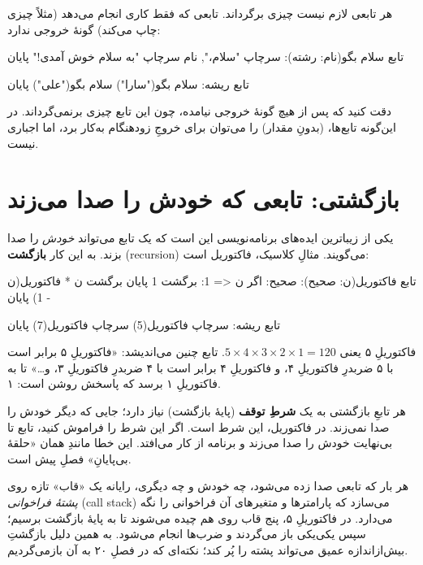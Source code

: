 هر تابعی لازم نیست چیزی برگرداند. تابعی که فقط کاری انجام می‌دهد (مثلاً چیزی
چاپ می‌کند) گونهٔ خروجی ندارد:

\begin{salamfa}
تابع سلام بگو(نام: رشته):
    سرچاپ "سلام،", نام
    سرچاپ "به سلام خوش آمدی!"
پایان

تابع ریشه:
    سلام بگو("سارا")
    سلام بگو("علی")
پایان
\end{salamfa}

دقت کنید که پس از  هیچ گونهٔ خروجی نیامده، چون این تابع چیزی
برنمی‌گرداند. در این‌گونه تابع‌ها،  (بدونِ مقدار) را می‌توان برای
خروجِ زودهنگام به‌کار برد، اما اجباری نیست.

\section{بازگشتی: تابعی که خودش را صدا می‌زند}

یکی از زیباترین ایده‌های برنامه‌نویسی این است که یک تابع می‌تواند \emph{خودش}
را صدا بزند. به این کار \textbf{بازگشت} (recursion)
می‌گویند. مثالِ کلاسیک، فاکتوریل است:

\begin{salamfa}
تابع فاکتوریل(ن: صحیح): صحیح:
    اگر ن <= 1:
        برگشت 1
    پایان
    برگشت ن * فاکتوریل(ن - 1)
پایان

تابع ریشه:
    سرچاپ فاکتوریل(5)
    سرچاپ فاکتوریل(7)
پایان
\end{salamfa}

فاکتوریلِ ۵ یعنی $5\times4\times3\times2\times1 = 120$. تابع چنین می‌اندیشد:
«فاکتوریلِ ۵ برابر است با ۵ ضربدرِ فاکتوریلِ ۴، و فاکتوریلِ ۴ برابر است با ۴
ضربدرِ فاکتوریلِ ۳، و\ldots» تا به فاکتوریلِ ۱ برسد که پاسخش روشن است: ۱.

\begin{warn}
هر تابعِ بازگشتی به یک \textbf{شرطِ توقف} (پایهٔ بازگشت) نیاز دارد؛ جایی که
دیگر خودش را صدا نمی‌زند. در فاکتوریل، این شرط  است. اگر این شرط
را فراموش کنید، تابع تا بی‌نهایت خودش را صدا می‌زند و برنامه از کار می‌افتد. این
خطا مانندِ همان «حلقهٔ بی‌پایانِ» فصلِ پیش است.
\end{warn}

\begin{deep}
هر بار که تابعی صدا زده می‌شود، چه خودش و چه دیگری، رایانه یک «قاب» تازه
روی \emph{پشتهٔ فراخوانی} (call stack) می‌سازد که پارامترها و متغیرهای آن
فراخوانی را نگه می‌دارد. در فاکتوریلِ ۵، پنج قاب روی هم چیده می‌شوند تا به پایهٔ
بازگشت برسیم؛ سپس یکی‌یکی باز می‌گردند و ضرب‌ها انجام می‌شود. به همین دلیل
بازگشتِ بیش‌از‌اندازه عمیق می‌تواند پشته را پُر کند؛ نکته‌ای که در فصلِ ۲۰
به آن بازمی‌گردیم.
\end{deep}

